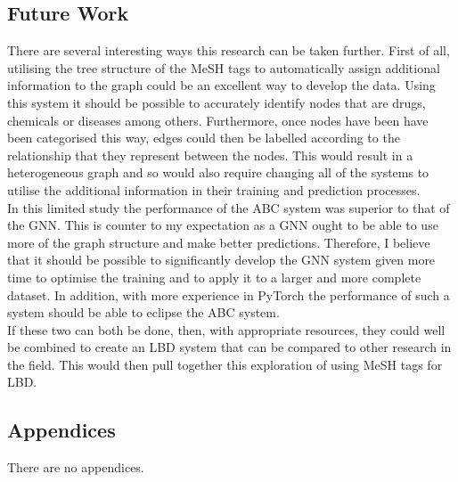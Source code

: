 \documentclass{l4proj}
\begin{document}
\section{Future Work}

There are several interesting ways this research can be taken further. First of all, utilising the tree structure of the MeSH tags to automatically assign additional information to the graph could be an excellent way to develop the data. Using this system it should be possible to accurately identify nodes that are drugs, chemicals or diseases among others. Furthermore, once nodes have been have been categorised this way, edges could then be labelled according to the relationship that they represent between the nodes. This would result in a heterogeneous graph and so would also require changing all of the systems to utilise the additional information in their training and prediction processes. \\

In this limited study the performance of the ABC system was superior to that of the GNN. This is counter to my expectation as a GNN ought to be able to use more of the graph structure and make better predictions. Therefore, I believe that it should be possible to significantly develop the GNN system given more time to optimise the training and to apply it to a larger and more complete dataset. In addition, with more experience in PyTorch the performance of such a system should be able to eclipse the ABC system. \\

If these two can both be done, then, with appropriate resources, they could well be combined to create an LBD system that can be compared to other research in the field. This would then pull together this exploration of using MeSH tags for LBD. \\

\begin{appendices}

\chapter{Appendices}

There are no appendices. 

\end{appendices}






\end{document}
